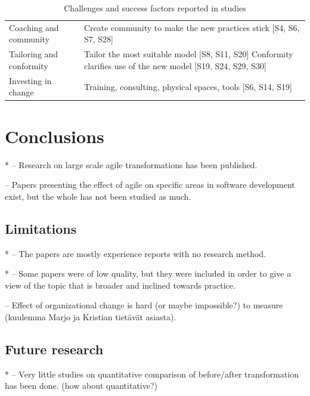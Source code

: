 \documentclass[lnbip]{svmultln}
\begin{document}
\begin{table}[h]
\begin{tabular}{ p{} p{} }
        \raggedright\rule{0pt}{0.4cm}Coaching and community  &
             Create community to make the new practices stick [S4, S6, S7, S28] \\
        
        \raggedright\rule{0pt}{0.4cm}Tailoring and conformity  &
            Tailor the most suitable model [S8, S11, S20] \newline
            Conformity clarifies use of the new model [S19, S24, S29, S30]\\
        
        \raggedright\rule{0pt}{0.4cm}Investing in change  &
            Training, consulting, physical spaces, tools [S6, S14, S19]\\
        \bottomrule
    \end{tabular}
    \caption{Challenges and success factors reported in studies}
    \label{table:success}
\end{table}


\section{Conclusions}
\label{sec:conclusions}

* -- Research on large scale agile transformations has been published.

-- Papers presenting the effect of agile on specific areas in software
development exist, but the whole has not been studied as much.

\subsection{Limitations}

* -- The papers are mostly experience reports with no research method.

* -- Some papers were of low quality, but they were included in order to give a
view of the topic that is broader and inclined towards practice.

-- Effect of organizational change is hard (or maybe impossible?) to measure
(kuulemma Marjo ja Kristian tietävät asiasta).

\subsection{Future research}

* -- Very little studies on quantitative comparison of before/after transformation
has been done. (how about quantitative?)
\end{document}

